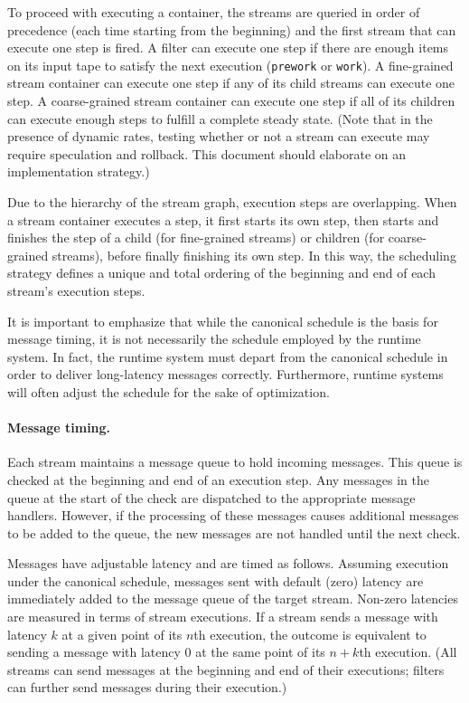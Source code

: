 To proceed with executing a container, the streams are queried in
order of precedence (each time starting from the beginning) and the
first stream that can execute one step is fired.  A filter can execute
one step if there are enough items on its input tape to satisfy the
next execution ({\tt prework} or {\tt work}).  A fine-grained stream
container can execute one step if any of its child streams can execute
one step.  A coarse-grained stream container can execute one step if
all of its children can execute enough steps to fulfill a complete
steady state.  (Note that in the presence of dynamic rates, testing
whether or not a stream can execute may require speculation and
rollback.  This document should elaborate on an implementation
strategy.)

Due to the hierarchy of the stream graph, execution steps are
overlapping.  When a stream container executes a step, it first starts
its own step, then starts and finishes the step of a child (for
fine-grained streams) or children (for coarse-grained streams), before
finally finishing its own step.  In this way, the scheduling strategy
defines a unique and total ordering of the beginning and end of each
stream's execution steps.

It is important to emphasize that while the canonical schedule is the
basis for message timing, it is not necessarily the schedule employed
by the runtime system.  In fact, the runtime system must depart from
the canonical schedule in order to deliver long-latency messages
correctly.  Furthermore, runtime systems will often adjust the
schedule for the sake of optimization.

\paragraph{Message timing.}  

Each stream maintains a message queue to hold incoming messages.  This
queue is checked at the beginning and end of an execution step.  Any
messages in the queue at the start of the check are dispatched to the
appropriate message handlers.  However, if the processing of these
messages causes additional messages to be added to the queue, the new
messages are not handled until the next check.

Messages have adjustable latency and are timed as follows.  Assuming
execution under the canonical schedule, messages sent with default
(zero) latency are immediately added to the message queue of the
target stream.  Non-zero latencies are measured in terms of stream
executions.  If a stream sends a message with latency $k$ at a given
point of its $n$th execution, the outcome is equivalent to sending a
message with latency 0 at the same point of its $n+k$th execution.
(All streams can send messages at the beginning and end of their
executions; filters can further send messages during their execution.)

